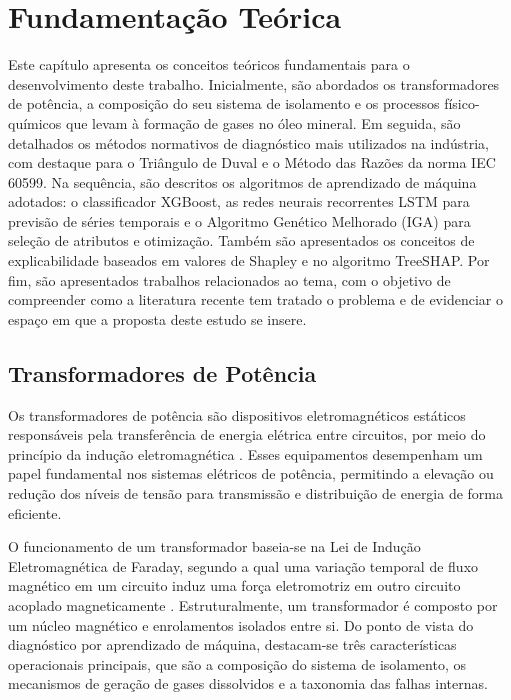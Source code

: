 \chapter{Fundamentação Teórica}\label{Fundamentacao}\label{cap:fundamentacao}

Este capítulo apresenta os conceitos teóricos fundamentais para o desenvolvimento deste trabalho. Inicialmente, são abordados os transformadores de potência, a composição do seu sistema de isolamento e os processos físico-químicos que levam à formação de gases no óleo mineral. Em seguida, são detalhados os métodos normativos de diagnóstico mais utilizados na indústria, com destaque para o Triângulo de Duval e o Método das Razões da norma IEC 60599. Na sequência, são descritos os algoritmos de aprendizado de máquina adotados: o classificador XGBoost, as redes neurais recorrentes LSTM para previsão de séries temporais e o Algoritmo Genético Melhorado (IGA) para seleção de atributos e otimização. Também são apresentados os conceitos de explicabilidade baseados em valores de Shapley e no algoritmo TreeSHAP. Por fim, são apresentados trabalhos relacionados ao tema, com o objetivo de compreender como a literatura recente tem tratado o problema e de evidenciar o espaço em que a proposta deste estudo se insere.

\section{Transformadores de Potência}\label{sec:transformadores_isolamento}

Os transformadores de potência são dispositivos eletromagnéticos estáticos responsáveis pela transferência de energia elétrica entre circuitos, por meio do princípio da indução eletromagnética \cite{ali2023}. Esses equipamentos desempenham um papel fundamental nos sistemas elétricos de potência, permitindo a elevação ou redução dos níveis de tensão para transmissão e distribuição de energia de forma eficiente.

O funcionamento de um transformador baseia-se na Lei de Indução Eletromagnética de Faraday, segundo a qual uma variação temporal de fluxo magnético em um circuito induz uma força eletromotriz em outro circuito acoplado magneticamente \cite{chapman2013}. Estruturalmente, um transformador é composto por um núcleo magnético e enrolamentos isolados entre si. Do ponto de vista do diagnóstico por aprendizado de máquina, destacam-se três características operacionais principais, que são a composição do sistema de isolamento, os mecanismos de geração de gases dissolvidos e a taxonomia das falhas internas.

